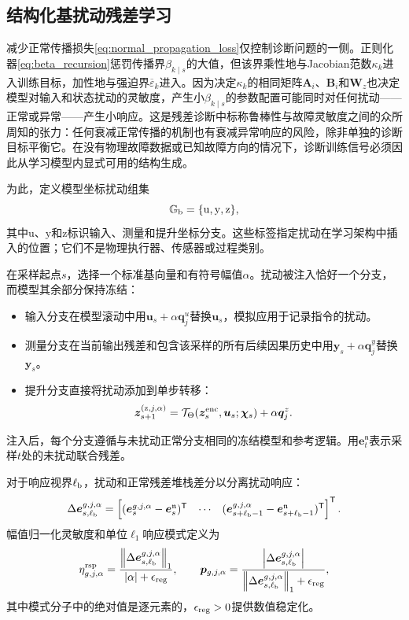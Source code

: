 \documentclass[journal]{IEEEtran}
\newcommand{\norm}[1]{\left\lVert #1\right\rVert}
\newcommand{\abs}[1]{\left\lvert #1\right\rvert}
\newcommand{\T}{\mathsf T}
\newcommand{\1}{\bm 1}
\begin{document}
\subsection{结构化基扰动残差学习}
减少正常传播损失\eqref{eq:normal_propagation_loss}仅控制诊断问题的一侧。正则化器\eqref{eq:beta_recursion}惩罚传播界$\beta_{k\mid s}$的大值，但该界乘性地与Jacobian范数$\kappa_k$进入训练目标，加性地与强迫界$\overline{\varepsilon}_k$进入。因为决定$\kappa_k$的相同矩阵$\bm A_i$、$\bm B_i$和$\bm W_z$也决定模型对输入和状态扰动的灵敏度，产生小$\beta_{k\mid s}$的参数配置可能同时对任何扰动——正常或异常——产生小响应。这是残差诊断中标称鲁棒性与故障灵敏度之间的众所周知的张力：任何衰减正常传播的机制也有衰减异常响应的风险，除非单独的诊断目标平衡它。在没有物理故障数据或已知故障方向的情况下，诊断训练信号必须因此从学习模型内显式可用的结构生成。

为此，定义模型坐标扰动组集
\begin{equation}
\mathbb G_{\rm b}=\{\mathrm u,\mathrm y,\mathrm z\},
\label{eq:group_set}
\end{equation}
其中$\mathrm u$、$\mathrm y$和$\mathrm z$标识输入、测量和提升坐标分支。这些标签指定扰动在学习架构中插入的位置；它们不是物理执行器、传感器或过程类别。

在采样起点$s$，选择一个标准基向量和有符号幅值$\alpha$。扰动被注入恰好一个分支，而模型其余部分保持冻结：
\begin{itemize}
\item 输入分支在模型滚动中用$\bm u_s+\alpha\bm q_j^u$替换$\bm u_s$，模拟应用于记录指令的扰动。
\item 测量分支在当前输出残差和包含该采样的所有后续因果历史中用$\bm y_s+\alpha\bm q_j^y$替换$\bm y_s$。
\item 提升分支直接将扰动添加到单步转移：
\begin{equation}
\bm z_{s+1}^{(\mathrm z,j,\alpha)}
=\mathcal T_\Theta(\bm z_s^{\rm enc},\bm u_s;\bm\chi_s)
+\alpha\bm q_j^z.
\label{eq:lifted_perturbation}
\end{equation}
\end{itemize}
注入后，每个分支遵循与未扰动正常分支相同的冻结模型和参考逻辑。用$\bm e_t^{\mathfrak n}$表示采样$t$处的未扰动联合残差。

对于响应视界$\ell_{\rm b}$，扰动和正常残差堆栈差分以分离扰动响应：
\begin{equation}
\Delta\bm e_{s,\ell_{\rm b}}^{g,j,\alpha}
=
\begin{bmatrix}
(\bm e_s^{g,j,\alpha}-\bm e_s^{\mathfrak n})^\T&
\cdots&
(\bm e_{s+\ell_{\rm b}-1}^{g,j,\alpha}
-\bm e_{s+\ell_{\rm b}-1}^{\mathfrak n})^\T
\end{bmatrix}^{\T}.
\label{eq:response_increment}
\end{equation}
幅值归一化灵敏度和单位$\ell_1$响应模式定义为
\begin{equation}
\eta_{g,j,\alpha}^{\rm rsp}=
\frac{\norm{\Delta\bm e_{s,\ell_{\rm b}}^{g,j,\alpha}}_1}
{\abs{\alpha}+\epsilon_{\rm reg}},
\qquad
\bm p_{g,j,\alpha}=
\frac{\abs{\Delta\bm e_{s,\ell_{\rm b}}^{g,j,\alpha}}}
{\norm{\Delta\bm e_{s,\ell_{\rm b}}^{g,j,\alpha}}_1+\epsilon_{\rm reg}},
\label{eq:response_pattern}
\end{equation}
其中模式分子中的绝对值是逐元素的，$\epsilon_{\rm reg}>0$提供数值稳定化。
\end{document}
